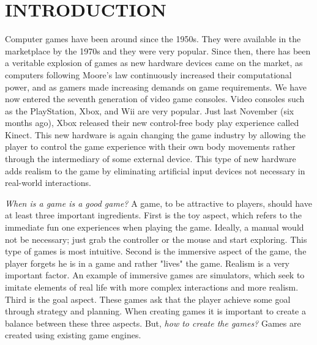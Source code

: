 \chapter{INTRODUCTION}\label{chap1}








Computer games have been around since the 1950s\cite{historyVideoGames}. They were available in the marketplace by the 1970s and they were very popular. Since then, there has been a veritable explosion of games as new hardware devices came on the market, as computers following Moore's law continuously increased their computational power, and as gamers made increasing demands on game requirements. We have now entered the seventh generation of video game consoles\cite{usingVideoGames}. Video consoles such as the PlayStation, Xbox, and Wii are very popular. Just last November (six months ago), Xbox released their new control-free body play experience called Kinect\cite{kinect}. This new hardware is again changing the game industry by allowing the player to control the game experience with their own body movements rather through the intermediary of some external device. This type of new hardware adds realism to the game by eliminating artificial input devices not necessary in real-world interactions.

\textit{When is a game is a good game?} A game, to be attractive to players, should have at least three important ingredients\cite{bookGameKit2}. First is the toy aspect, which refers to the immediate fun one experiences when playing the game. Ideally, a manual would not be necessary;  just grab the controller or the mouse and start exploring. This type of games is most intuitive. Second is the immersive aspect of the game, the player forgets he is in a game and rather "lives" the game. Realism is a very important factor. An example of immersive games are simulators, which seek to imitate elements of real life with more complex interactions and more realism. Third is the goal aspect. These games ask that the player achieve some goal through strategy and planning. When creating games it is important to create a balance between these three aspects. But, \textit{how to create the games?} Games are created using existing game engines.


